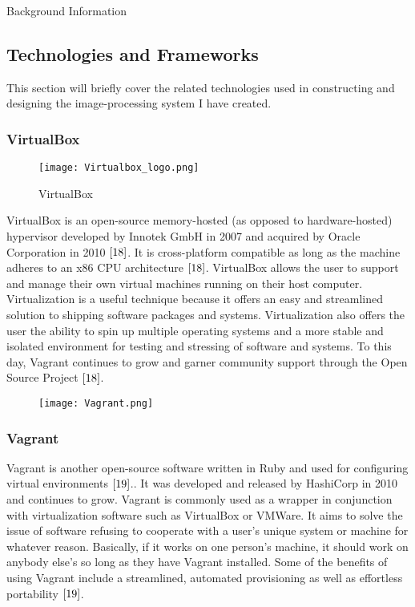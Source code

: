\documentclass[a4paper,12pt]{article}
\begin{document}
\begin{section}{Background Information}
\newpage
\subsection{Technologies and Frameworks}

This section will briefly cover the related technologies used in constructing and designing the image-processing system I have created.

\singlespacing

\subsubsection{VirtualBox}


\begin{wrapfigure}{L}{0.5\textwidth}
\centering
\texttt{[image: Virtualbox\_logo.png]}
\caption{VirtualBox}
\end{wrapfigure}

VirtualBox is an open-source memory-hosted (as opposed to hardware-hosted) hypervisor developed by Innotek GmbH in 2007 and acquired by Oracle Corporation in 2010 $\cite{18}$. 
It is cross-platform compatible as long as the machine adheres to an x86 CPU architecture $\cite{18}$. VirtualBox allows the user to support and manage their own virtual machines running on their host computer. Virtualization is a useful technique because it offers an easy and streamlined solution to shipping software packages and systems. Virtualization also offers the user the ability to spin up multiple operating systems and a more stable and isolated environment for testing and stressing of software and systems. To this day, Vagrant continues to grow and garner community support through the Open Source Project $\cite{18}$.

\begin{wrapfigure}{R}{0.2\textwidth}
\begin{center}
\texttt{[image: Vagrant.png]}
\end{center}
\end{wrapfigure}

\subsubsection{Vagrant}

Vagrant is another open-source software written in Ruby and used for configuring virtual environments $\cite{19}$.. It was developed and released by HashiCorp in 2010 and continues to grow. Vagrant is commonly used as a wrapper in conjunction with virtualization software such as VirtualBox or VMWare. It aims to solve the issue of software refusing to cooperate with a user's unique system or machine for whatever reason. Basically, if it works on one person's machine, it should work on anybody else's so long as they have Vagrant installed. Some of the benefits of using Vagrant include a streamlined, automated provisioning as well as effortless portability $\cite{19}$. 


\end{section}
\end{document}
